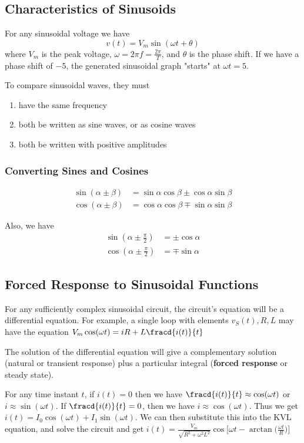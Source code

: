 \documentclass[12pt]{article}
\begin{document}
\subsection*{Characteristics of Sinusoids}
For any sinusoidal voltage we have \[ v(t) = V_m \sin(\omega t + \theta) \] where $V_m$ is the peak voltage, $\omega = 2\pi f = \frac{2\pi}{T}$, and $\theta$ is the phase shift. If we have a phase shift of $-5$, the generated sinusoidal graph "starts" at $\omega t = 5$.

To compare sinusoidal waves, they must
\begin{enumerate}
\item have the same frequency
\item both be written as sine waves, or as cosine waves
\item both be written with positive amplitudes
\end{enumerate}

\subsubsection*{Converting Sines and Cosines}
\begin{align*}
\sin(\alpha \pm \beta) &= \sin\alpha\cos\beta \pm \cos\alpha\sin\beta\\
\cos(\alpha \pm \beta) &= \cos\alpha\cos\beta \mp \sin\alpha\sin\beta
\end{align*}

Also, we have
\begin{align*}
\sin(\alpha \pm \frac{\pi}{2}) &= \pm\cos\alpha\\
\cos(\alpha \pm \frac{\pi}{2}) &= \mp\sin\alpha
\end{align*}

\subsection*{Forced Response to Sinusoidal Functions}
For any sufficiently complex sinusoidal circuit, the circuit's equation will be a differential equation. For example, a single loop with elements $v_S(t), R, L$ may have the equation $V_m \cos(\omega t) = iR + L\fracd{i(t)}{t}$

The solution of the differential equation will give a complementary solution (natural or transient response) plus a particular integral ({\bf forced response} or steady state).

For any time instant $t$, if $i(t) = 0$ then we have $\fracd{i(t)}{t} \approx \cos(\omega t)$ or $i \approx \sin(\omega t)$. If $\fracd{i(t)}{t} = 0$, then we have $i \approx \cos(\omega t)$. Thus we get $i(t) = I_0\cos(\omega t) + I_1\sin(\omega t)$. We can then substitute this into the KVL equation, and solve the circuit and get $i(t) = \frac{V_m}{\sqrt{R^2 + \omega^2L^2}}\cos\bigg[\omega t - \arctan\bigl(\frac{\omega t}{R}\bigl)\bigg]$
\end{document}
